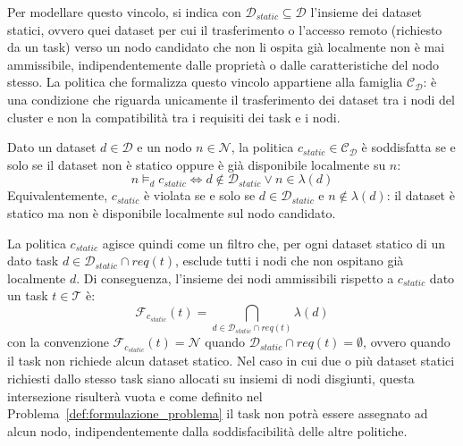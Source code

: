 Per modellare questo vincolo, si indica con $\mathcal{D}_{static} \subseteq \mathcal{D}$ l'insieme dei dataset statici, ovvero quei dataset per cui il trasferimento o l'accesso remoto (richiesto da un task) verso un nodo candidato che non li ospita già localmente non è mai ammissibile, indipendentemente dalle proprietà o dalle caratteristiche del nodo stesso. La politica che formalizza questo vincolo appartiene alla famiglia $\mathcal{C_D}$: è una condizione che riguarda unicamente il trasferimento dei dataset tra i nodi del cluster e non la compatibilità tra i requisiti dei task e i nodi.

\begin{policy}
    \label{pol:c_static}
    Dato un dataset $d \in \mathcal{D}$ e un nodo $n \in \mathcal{N}$, la politica $c_{static} \in \mathcal{C_D}$ è soddisfatta se e solo se il dataset non è statico oppure è già disponibile localmente su $n$:
    \begin{equation}
        n \models_d c_{static}
        \iff
        d \notin \mathcal{D}_{static} \lor n \in \lambda(d)
    \end{equation}
    Equivalentemente, $c_{static}$ è violata se e solo se $d \in \mathcal{D}_{static}$ e $n \notin \lambda(d)$: il dataset è statico ma non è disponibile localmente sul nodo candidato.
\end{policy}

La politica $c_{static}$ agisce quindi come un filtro che, per ogni dataset statico di un dato task $d \in \mathcal{D}_{static} \cap req(t)$, esclude tutti i nodi che non ospitano già localmente $d$. Di conseguenza, l'insieme dei nodi ammissibili rispetto a $c_{static}$ dato un task $t \in \mathcal{T}$ è:
\begin{equation}
    \mathcal{F}_{c_{static}}(t)
    = \bigcap_{d \in \mathcal{D}_{static} \cap req(t)} \lambda(d)
\end{equation}
con la convenzione $\mathcal{F}_{c_{static}}(t) = \mathcal{N}$ quando $\mathcal{D}_{static} \cap req(t) = \emptyset$, ovvero quando il task non richiede alcun dataset statico. Nel caso in cui due o più dataset statici richiesti dallo stesso task siano allocati su insiemi di nodi disgiunti, questa intersezione risulterà vuota e come definito nel Problema~\ref{def:formulazione_problema} il task non potrà essere assegnato ad alcun nodo, indipendentemente dalla soddisfacibilità delle altre politiche.

